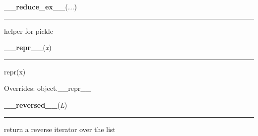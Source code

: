     \label{object:__reduce_ex__}

    \vspace{0.5ex}

    \begin{boxedminipage}{\textwidth}

    \raggedright \textbf{\_\_reduce\_ex\_\_}(\textit{...})

    \vspace{-1.5ex}

    \rule{\textwidth}{0.5\fboxrule}

helper for pickle
    \vspace{1ex}

    \end{boxedminipage}

    \vspace{0.5ex}

    \begin{boxedminipage}{\textwidth}

    \raggedright \textbf{\_\_repr\_\_}(\textit{x})

    \vspace{-1.5ex}

    \rule{\textwidth}{0.5\fboxrule}

repr(x)
    \vspace{1ex}

      Overrides: object.\_\_repr\_\_

    \end{boxedminipage}

    \label{list:__reversed__}

    \vspace{0.5ex}

    \begin{boxedminipage}{\textwidth}

    \raggedright \textbf{\_\_reversed\_\_}(\textit{L})

    \vspace{-1.5ex}

    \rule{\textwidth}{0.5\fboxrule}

return a reverse iterator over the list
    \vspace{1ex}

    \end{boxedminipage}

    \label{list:__rmul__}

